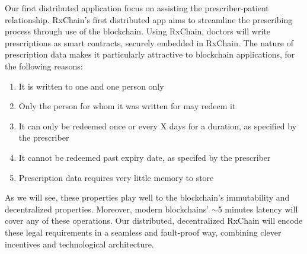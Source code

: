 Our first distributed application focus on assisting the prescriber-patient relationship.
RxChain's first distributed app aims to streamline the prescribing process through use of the blockchain.
Using RxChain, doctors will write prescriptions as smart contracts, securely embedded in RxChain.
The nature of prescription data makes it particularly attractive to blockchain applications, for the following reasons:

\begin{enumerate}
  
  \item It is written to one and one person only
  \item Only the person for whom it was written for may redeem it
  \item It can only be redeemed once or every X days for a duration, as specified by the prescriber
  \item It cannot be redeemed past expiry date, as specifed by the prescriber
  \item Prescription data requires very little memory to store

\end{enumerate}

As we will see, these properties play well to the blockchain's immutability and decentralized properties.
Moreover, modern blockchains' $\sim$5 minutes latency will cover any of these operations.
Our distributed, decentralized RxChain will encode these legal requirements in a seamless and fault-proof way,
combining clever incentives and technological architecture.
